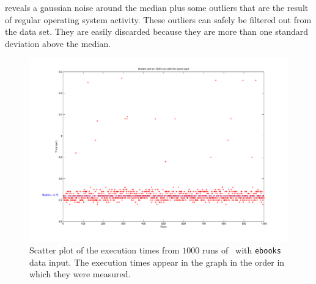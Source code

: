  reveals a gaussian noise around the median plus some outliers that are the result of regular operating system activity. These outliers can safely be filtered out from the data set. They are easily discarded because they are more than one standard deviation above the median.


\begin{figure}
  \centering
  \includegraphics[width=1.00\linewidth]{Figures/nt1000}
  \caption{Scatter plot of the execution times from $1000$ runs of \bzip\ with {\tt ebooks} data input. The execution times appear in the graph in the order in which they were measured.}
  \label{fig:gauss}
\end{figure}

